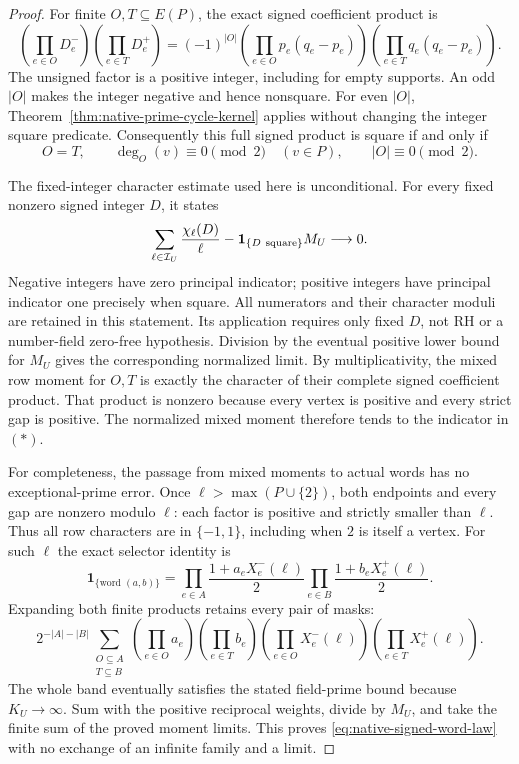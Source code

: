 \documentclass[11pt]{article}
\newcommand{\T}{\mathbf T}
\begin{document}
\begin{proof}
For finite \(O,T\subseteq E(P)\), the exact signed coefficient product is
\[
 \left(\prod_{e\in O}D^-_e\right)
 \left(\prod_{e\in T}D^+_e\right)
 =(-1)^{|O|}
   \left(\prod_{e\in O}p_e(q_e-p_e)\right)
   \left(\prod_{e\in T}q_e(q_e-p_e)\right).
\]
The unsigned factor is a positive integer, including for empty supports.
An odd \(|O|\) makes the integer negative and hence nonsquare.
For even \(|O|\), Theorem~\ref{thm:native-prime-cycle-kernel} applies
without changing the integer square predicate. Consequently this full
signed product is square if and only if
\[
 O=T,\qquad \deg_O(v)\equiv0\pmod2\quad(v\in P),\qquad
 |O|\equiv0\pmod2.                                      \tag{*}
\]

The fixed-integer character estimate used here is unconditional.
For every fixed nonzero signed integer \(D\), it states
\[
 \sum_{\ell\in\mathcal I_U}\frac{\chi_\ell(D)}{\ell}
       -\mathbf1_{\{D\ {\rm square}\}}M_U\longrightarrow0.
\]
Negative integers have zero principal indicator; positive integers have
principal indicator one precisely when square.
All numerators and their character moduli are retained in this statement.
Its application requires only fixed \(D\), not RH or a number-field
zero-free hypothesis. Division by the eventual positive lower bound for
\(M_U\) gives the corresponding normalized limit.
By multiplicativity, the mixed row moment for \(O,T\) is exactly the
character of their complete signed coefficient product.
That product is nonzero because every vertex is positive and every
strict gap is positive. The normalized mixed moment therefore tends
to the indicator in \((*)\).

For completeness, the passage from mixed moments to actual words has
no exceptional-prime error. Once
\(\ell>\max(P\cup\{2\})\), both endpoints and every gap are nonzero
modulo \(\ell\): each factor is positive and strictly smaller than
\(\ell\). Thus all row characters are in \(\{-1,1\}\), including
when \(2\) is itself a vertex.
For such \(\ell\) the exact selector identity is
\[
 \mathbf1_{\{\text{word }(a,b)\}}
 =
 \prod_{e\in A}\frac{1+a_eX^-_e(\ell)}2
 \prod_{e\in B}\frac{1+b_eX^+_e(\ell)}2.
\]
Expanding both finite products retains every pair of masks:
\[
 2^{-|A|-|B|}
 \sum_{\substack{O\subseteq A\\T\subseteq B}}
 \left(\prod_{e\in O}a_e\right)\left(\prod_{e\in T}b_e\right)
 \left(\prod_{e\in O}X^-_e(\ell)\right)
 \left(\prod_{e\in T}X^+_e(\ell)\right).
\]
The whole band eventually satisfies the stated field-prime bound
because \(K_U\to\infty\). Sum with the positive reciprocal weights,
divide by \(M_U\), and take the finite sum of the proved moment limits.
This proves \eqref{eq:native-signed-word-law} with no exchange of an
infinite family and a limit.


\end{proof}
\end{document}
